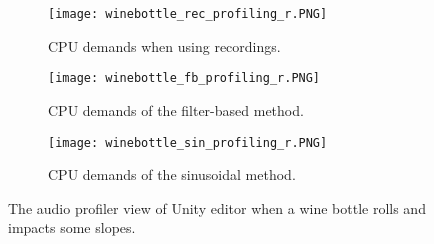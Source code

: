 


\begin{figure}[H]
    \centering
    \begin{subfigure}[b]{\textwidth}
    \centering
        \texttt{[image: winebottle\_rec\_profiling\_r.PNG]}
        \caption{CPU demands when using recordings.}
        \label{fig:recordprofiler}
    \end{subfigure}
\par\bigskip %
    \begin{subfigure}[b]{\textwidth}
    \centering
        \texttt{[image: winebottle\_fb\_profiling\_r.PNG]}
        \caption{CPU demands of the filter-based method.}
        \label{fig:fbprofiler}
    \end{subfigure}
\par\bigskip %
    \begin{subfigure}[b]{\textwidth}
    \centering
        \texttt{[image: winebottle\_sin\_profiling\_r.PNG]}
        \caption{CPU demands of the sinusoidal method.}
        \label{fig:sinprofiler}
    \end{subfigure}
    \caption{The audio profiler view of Unity\textsuperscript{\textregistered} editor when a wine bottle rolls and impacts some slopes.}\label{fig:method_profiler}
\end{figure}


